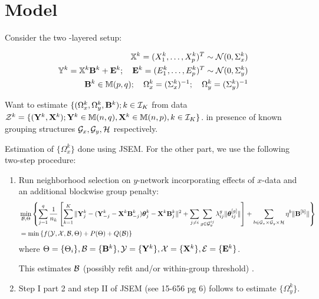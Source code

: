 \documentclass[fleqn,11pt]{article}
\numberwithin{equation}{section}
\begin{document}
\section{Model}
Consider the two -layered setup:

\begin{eqnarray}
{\mathbb{X}}^k = (X^k_1, \ldots, X^k_p)^T \sim {\cal{N}} (0, \Sigma^k_x)\\
{\mathbb{Y}}^k = {\mathbb{X}}^k {\mathbf{B}}^k + {\mathbf{E}}^k; \quad {\mathbf{E}}^k = (E^k_1, \ldots, E^k_p)^T \sim {\cal{N}} (0, \Sigma^k_y)\\
{\mathbf{B}}^k \in {\mathbb{M}}(p,q); \quad \Omega^k_x = (\Sigma^k_x)^{-1}; \quad \Omega^k_y = (\Sigma^k_y)^{-1}
\end{eqnarray}

Want to estimate $\{ (\Omega^k_x, \Omega^k_y, {\mathbf{B}}^k); k \in {\cal{I}}_K$ from data ${\cal{Z}}^k = \{ ({\mathbf{Y}}^k, {\mathbf{X}}^k); {\mathbf{Y}}^k \in {\mathbb{M}}(n,q), {\mathbf{X}}^k \in {\mathbb{M}}(n,p), k \in {\cal{I}}_K\}$. in presence of known grouping structures ${\cal{G}}_x, {\cal{G}}_y, {\cal{H}}$ respectively. 


Estimation of $\{ \Omega_x^k \}$ done using JSEM. For the other part, we use the following two-step procedure:

\begin{enumerate}
\item Run neighborhood selection on $y$-network incorporating effects of $x$-data and an additional blockwise group penalty:
%
\begin{align}
& \min_{{\cal{B}}, \Theta} \left\{ \sum_{j=1}^q  \frac{1}{n_k} \left[ \sum_{k=1}^K \| {\mathbf{Y}}^k_j - ({\mathbf{Y}}_{-j}^k - {\mathbf{X}}^k {\mathbf{B}}_{-j}^k) {\boldsymbol{\theta}}_j^k - {\mathbf{X}}^k {\mathbf{B}}_j^k \|^2 + \sum_{j \neq i} \sum_{g \in {\cal{G}}_y^{ij}} \lambda_{ij}^g \| {\boldsymbol{\theta}}_{ij}^{[g]} \| \right] + \sum_{b \in {\cal{G}}_x \times {\cal{G}}_y \times {\cal{H}}} \eta^b \| {\mathbf{B}}^{[b]} \| \right\}\\
&= \min \left\{ f ( {\cal{Y}}, {\cal{X}}, {\cal{B}}, \Theta) + P (\Theta) + Q ({\cal{B}}) \right\} 
\end{align}
%
where $\Theta = \{ \Theta_i \}, {\cal{B}} = \{ {\mathbf{B}}^k \}, {\cal{Y}} = \{ {\mathbf{Y}}^k \}, {\cal{X}} = \{ {\mathbf{X}}^k \}, {\cal{E}} = \{ {\mathbf{E}}^k \}$.

This estimates ${\cal{B}}$ { \colrbf (possibly refit and/or within-group threshold) }.

\item Step I part 2 and step II of JSEM (see 15-656 pg 6) follows to estimate $\{ \Omega_y^k \}$.
\end{enumerate}
\end{document}
